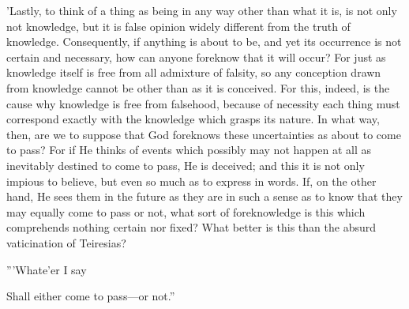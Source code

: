 'Lastly, to think of a thing as being in any way other than what it is,
is not only not knowledge, but it is false opinion widely different from
the truth of knowledge. Consequently, if anything is about to be, and
yet its occurrence is not certain and necessary, how can anyone foreknow
that it will occur? For just as knowledge itself is free from all
admixture of falsity, so any conception drawn from knowledge cannot be
other than as it is conceived. For this, indeed, is the cause why
knowledge is free from falsehood, because of necessity each thing must
correspond exactly with the knowledge which grasps its nature. In what
way, then, are we to suppose that God foreknows these uncertainties as
about to come to pass? For if He thinks of events which possibly may not
happen at all as inevitably destined to come to pass, He is deceived;
and this it is not only impious to believe, but even so much as to
express in words. If, on the other hand, He sees them in the future as
they are in such a sense as to know that they may equally come to pass
or not, what sort of foreknowledge is this which comprehends nothing
certain nor fixed? What better is this than the absurd vaticination of
Teiresias?

'''Whate'er I say

Shall either come to pass—or not.''

